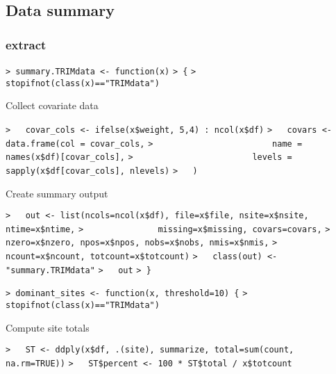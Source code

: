\documentclass[a4paper]{article}
\begin{document}
\subsection{Data summary}\par



\subsubsection{extract}\par

\verb~> summary.TRIMdata <- function(x)~\newline
\verb~> {~\newline
\verb~>   stopifnot(class(x)=="TRIMdata")~\par

Collect covariate data\par
\verb~>   covar_cols <- ifelse(x$weight, 5,4) : ncol(x$df)~\newline
\verb~>   covars <- data.frame(col = covar_cols,~\newline
\verb~>                        name = names(x$df)[covar_cols],~\newline
\verb~>                        levels = sapply(x$df[covar_cols], nlevels)~\newline
\verb~>   )~\par

Create summary output\par
\verb~>   out <- list(ncols=ncol(x$df), file=x$file, nsite=x$nsite, ntime=x$ntime,~\newline
\verb~>               missing=x$missing, covars=covars,~\newline
\verb~>               nzero=x$nzero, npos=x$npos, nobs=x$nobs, nmis=x$nmis,~\newline
\verb~>               ncount=x$ncount, totcount=x$totcount)~\newline
\verb~>   class(out) <- "summary.TRIMdata"~\newline
\verb~>   out~\newline
\verb~> }~\par

\verb~> dominant_sites <- function(x, threshold=10) {~\newline
\verb~>   stopifnot(class(x)=="TRIMdata")~\par

Compute site totals\par
\verb~>   ST <- ddply(x$df, .(site), summarize, total=sum(count, na.rm=TRUE))~\newline
\verb~>   ST$percent <- 100 * ST$total / x$totcount~\par
\end{document}
